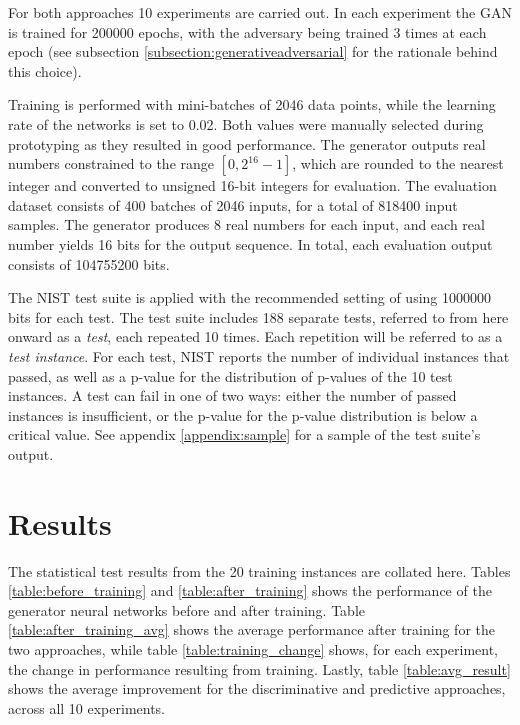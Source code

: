 \documentclass[12pt, titlepage]{report}
\theoremstyle{definition}
\begin{document}
For both approaches 10 experiments are carried out. In each experiment the GAN is trained for 200000 epochs, with the adversary being trained 3 times at each epoch (see subsection \ref{subsection:generativeadversarial} for the rationale behind this choice). 

Training is performed with mini-batches of 2046 data points, while the learning rate of the networks is set to 0.02. Both values were manually selected during prototyping as they resulted in good performance. The generator outputs real numbers constrained to the range $[0, 2^{16}-1]$, which are rounded to the nearest integer and converted to unsigned 16-bit integers for evaluation. The evaluation dataset consists of 400 batches of 2046 inputs, for a total of 818400 input samples. The generator produces 8 real numbers for each input, and each real number yields 16 bits for the output sequence. In total, each evaluation output consists of 104755200 bits. 

The NIST test suite is applied with the recommended setting of using 1000000 bits for each test. The test suite includes 188 separate tests, referred to from here onward as a \emph{test}, each repeated 10 times. Each repetition will be referred to as a \emph{test instance}. For each test, NIST reports the number of individual instances that passed, as well as a p-value for the distribution of p-values of the 10 test instances. A test can fail in one of two ways: either the number of passed instances is insufficient, or the p-value for the p-value distribution is below a critical value. See appendix \ref{appendix:sample} for a sample of the test suite's output.


\section{Results}
The statistical test results from the 20 training instances are collated here. Tables \ref{table:before_training} and \ref{table:after_training} shows the performance of the generator neural networks before and after training. Table \ref{table:after_training_avg} shows the average performance after training for the two approaches, while table \ref{table:training_change} shows, for each experiment, the change in performance resulting from training. Lastly, table \ref{table:avg_result} shows the average improvement for the discriminative and predictive approaches, across all 10 experiments.
\end{document}
